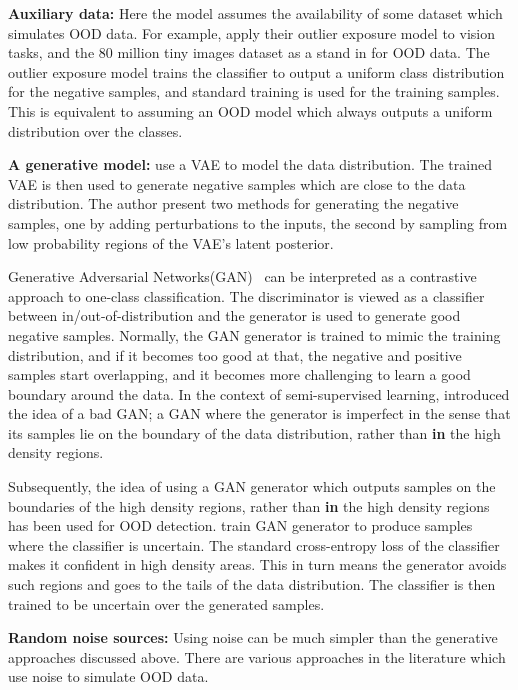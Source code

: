 \documentclass[../main.tex]{subfiles}
\begin{document}
\textbf{Auxiliary data:} Here the model assumes the availability of some dataset which simulates OOD data. For example, \citet{hendrycks2018deep} apply their outlier exposure model to vision tasks, and the 80 million tiny images\citep{torralba200880} dataset as a stand in for OOD data. The outlier exposure model trains the classifier to output a uniform class distribution for the negative samples, and standard training is used for the training samples. This is equivalent to assuming an OOD model  which always outputs a uniform distribution over the classes. 

\textbf{A generative model:} \citet{vernekar} use a VAE to model the data distribution. The trained VAE is then used to generate negative samples which are close to the data distribution. The author present two methods for generating the negative samples, one by adding perturbations to the inputs, the second by sampling from low probability regions of the VAE's latent posterior.

Generative Adversarial Networks(GAN)~\citep{goodfellow2014generative} can be interpreted as a contrastive approach to one-class classification. The discriminator is viewed as a classifier between in/out-of-distribution and the generator is used to generate good negative samples. Normally, the GAN generator is trained to mimic the training distribution, and if it becomes too good at that, the negative and positive samples start overlapping, and it becomes more challenging to learn a good boundary around the data\citep{dai2017good}. In the context of semi-supervised learning, \citet{dai2017good} introduced the idea of a bad GAN; a GAN where the generator is imperfect in the sense that its samples lie on the boundary of the data distribution, rather than \textbf{in} the high density regions.

Subsequently, the idea of using a GAN generator which outputs samples on the boundaries of the high density regions, rather than \textbf{in} the high density regions has been used for OOD detection. 
\cite{lee2017training} train GAN generator to produce samples where the classifier is uncertain. The standard cross-entropy loss of the classifier makes it confident in high density areas. This in turn means the generator avoids such regions and goes to the tails of the data distribution. The classifier is then trained to be uncertain over the generated samples. 

\textbf{Random noise sources:} Using noise can be much simpler than the generative approaches discussed above. There are various approaches in the literature which use noise to  simulate OOD data. 
\end{document}
